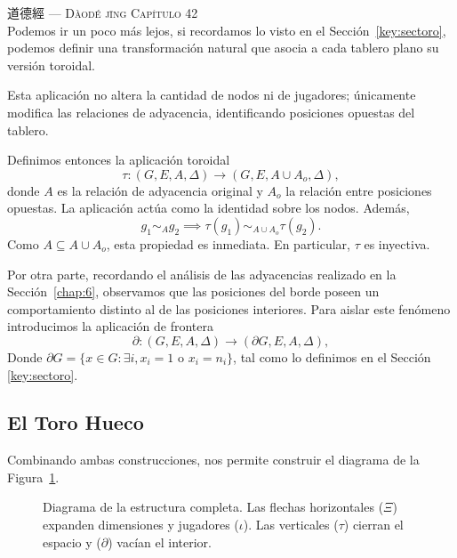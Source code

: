 \vspace{1pt}
\hfill  道德經 — {\textsc{Dàodé jīng Capítulo 42}}\\

Podemos ir un poco más lejos, si recordamos lo visto en el Sección~\ref{key:sectoro}, podemos definir una transformación natural que asocia a cada tablero plano su versión toroidal.

Esta aplicación no altera la cantidad de nodos ni de jugadores; únicamente modifica las relaciones de adyacencia, identificando posiciones opuestas del tablero.

Definimos entonces la aplicación toroidal
\[\tau:(G,E,A,\Delta)\to(G,E,A\cup A_o,\Delta),\]
donde $A$ es la relación de adyacencia original y $A_o$ la relación entre posiciones opuestas.
La aplicación actúa como la identidad sobre los nodos. Además,
\[g_1\sim_A g_2\implies\tau(g_1)\sim_{A\cup A_o}\tau(g_2).\]
Como $A\subseteq A\cup A_o$, esta propiedad es inmediata. En particular, $\tau$ es inyectiva.

Por otra parte, recordando el análisis de las adyacencias realizado en la Sección~\ref{chap:6}, observamos que las posiciones del borde poseen un comportamiento distinto al de las posiciones interiores. Para aislar este fenómeno introducimos la aplicación de frontera
\[\partial:(G,E,A,\Delta)\to(\partial G,E,A,\Delta),\]
Donde $\partial G = \{ x \in G : \exists i, x_i = 1 \text{ o } x_i = n_i \}$, tal como lo definimos en el Sección~ \ref{key:sectoro}.
\subsection*{El Toro Hueco}
Combinando ambas construcciones, nos permite construir el diagrama de la Figura~\ref{fig: torohueco}. 

\begin{figure}[H]
	\centering
	\caption{Diagrama de la estructura completa. Las flechas horizontales ($\Xi$) expanden dimensiones y jugadores ($\iota$). Las verticales ($\tau$) cierran el espacio y ($\partial$) vacían el interior.}
	\label{fig: torohueco}
\end{figure}

